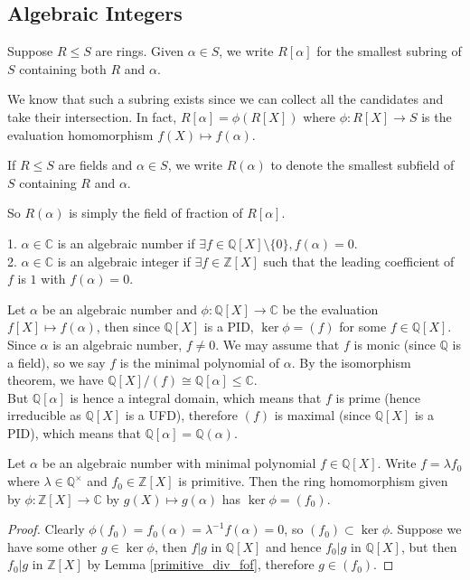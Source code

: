 \subsection{Algebraic Integers}
\begin{definition}
    Suppose $R\le S$ are rings.
    Given $\alpha\in S$, we write $R[\alpha]$ for the smallest subring of $S$ containing both $R$ and $\alpha$.
\end{definition}
We know that such a subring exists since we can collect all the candidates and take their intersection.
In fact, $R[\alpha]=\phi(R[X])$ where $\phi:R[X]\to S$ is the evaluation homomorphism $f(X)\mapsto f(\alpha)$.
\begin{definition}
    If $R\le S$ are fields and $\alpha\in S$, we write $R(\alpha)$ to denote the smallest subfield of $S$ containing $R$ and $\alpha$.
\end{definition}
So $R(\alpha)$ is simply the field of fraction of $R[\alpha]$.
\begin{definition}
    1. $\alpha\in\mathbb C$ is an algebraic number if $\exists f\in\mathbb Q[X]\setminus\{0\},f(\alpha)=0$.\\
    2. $\alpha\in\mathbb C$ is an algebraic integer if $\exists f\in\mathbb Z[X]$ such that the leading coefficient of $f$ is $1$ with $f(\alpha)=0$.
\end{definition}
Let $\alpha$ be an algebraic number and $\phi:\mathbb Q[X]\to\mathbb C$ be the evaluation $f[X]\mapsto f(\alpha)$, then since $\mathbb Q[X]$ is a PID, $\ker\phi=(f)$ for some $f\in\mathbb Q[X]$.
Since $\alpha$ is an algebraic number, $f\neq 0$.
We may assume that $f$ is monic (since $\mathbb Q$ is a field), so we say $f$ is the minimal polynomial of $\alpha$.
By the isomorphism theorem, we have $\mathbb Q[X]/(f)\cong \mathbb Q[\alpha]\le\mathbb C$.\\
But $\mathbb Q[\alpha]$ is hence a integral domain, which means that $f$ is prime (hence irreducible as $\mathbb Q[X]$ is a UFD), therefore $(f)$ is maximal (since $\mathbb Q[X]$ is a PID), which means that $\mathbb Q[\alpha]=\mathbb Q(\alpha)$.
\begin{lemma}
    Let $\alpha$ be an algebraic number with minimal polynomial $f\in\mathbb Q[X]$.
    Write $f=\lambda f_0$ where $\lambda\in\mathbb Q^\times$ and $f_0\in\mathbb Z[X]$ is primitive.
    Then the ring homomorphism given by $\phi:\mathbb Z[X]\to\mathbb C$ by $g(X)\mapsto g(\alpha)$ has $\ker\phi=(f_0)$.
\end{lemma}
\begin{proof}
    Clearly $\phi(f_0)=f_0(\alpha)=\lambda^{-1}f(\alpha)=0$, so $(f_0)\subset\ker\phi$.
    Suppose we have some other $g\in\ker\phi$, then $f|g$ in $\mathbb Q[X]$ and hence $f_0|g$ in $\mathbb Q[X]$, but then $f_0|g$ in $\mathbb Z[X]$ by Lemma \ref{primitive_div_fof}, therefore $g\in(f_0)$.
\end{proof}
